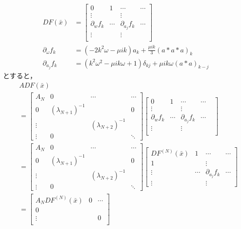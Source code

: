 \documentclass[11pt,a4paper]{jsarticle}
\theoremstyle{definition}
\begin{document}
\begin{equation*}
  \begin{split}
    DF(\bar{x}) &=
    \begin{bmatrix}
      0 & 1  & \cdots & \cdots \\
      \vdots & & \vdots &  \\
      \partial_w f_k & \cdots & \partial_{a_j}f_k & \cdots  \\
      \vdots & & \vdots &  \\
    \end{bmatrix}\\
    \partial_\omega f_k &= (-2k^2\omega-\mu ik)a_k + \frac{\mu ik}{3} (a*a*a)_k \\
    \partial_{a_j} f_k &= (k^2\omega^2-\mu ik\omega +1)\delta_{kj} + \mu ik \omega (a*a)_{k-j}
  \end{split}
\end{equation*}
とすると，
\begin{equation}
  \begin{split}
    &ADF(\bar{x}) \\
    &= \begin{bmatrix}
      A_N & 0  & \cdots & \cdots  \\
      0 & (\lambda_{N+1})^{-1} & & 0 \\
      \vdots &               & (\lambda_{N+2})^{-1} & \\
      \vdots & 0 & & \ddots
    \end{bmatrix}
    \begin{bmatrix}
      0 & 1  & \cdots & \cdots\\
      \vdots & & \vdots & & \\
      \partial_w f_k & \cdots & \partial_{a_j}f_k & \cdots & \\
      \vdots & & \vdots & & \\
   \end{bmatrix}\\
    &= \begin{bmatrix}
      A_N & 0  & \cdots & \cdots  \\
      0 & (\lambda_{N+1})^{-1} & & 0 \\
      \vdots & & (\lambda_{N+2})^{-1} & \\
      \vdots & 0 & & \ddots
    \end{bmatrix}
    \begin{bmatrix}
      DF^{(N)}{(\bar{x})} & 1  & \cdots & \cdots \\
      1 & & \vdots & \\
      \vdots & \cdots & \partial_{a_j}f_k & \cdots \\
      \vdots & & \vdots &
   \end{bmatrix}\\
    &=
    \begin{bmatrix}
        A_N DF^{(N)}(\bar{x}) & 0 & \cdots \\
        0 & & \\
        \vdots & & 0 \\
    \end{bmatrix}
  \end{split}
\end{equation}
\end{document}
